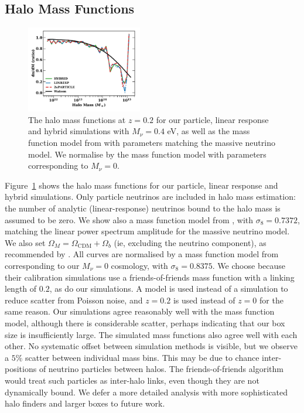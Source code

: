 \documentclass[useAMS, usenatbib]{mnras}
\begin{document}
\subsection{Halo Mass Functions}
\label{sec:halomass}

\begin{figure}
  \includegraphics[width=0.45\textwidth]{nuplots/hmf-0_8333.pdf}
\caption{The halo mass functions at $z=0.2$ for our particle, linear response and hybrid simulations with $M_\nu = 0.4$ eV, as well as the mass function model from \protect\cite{Watson_2013} with parameters matching the massive neutrino model. We normalise by the mass function model with parameters corresponding to $M_\nu = 0$.}
  \label{fig:halomass}
\end{figure}

Figure~\ref{fig:halomass} shows the halo mass functions for our particle, linear response and hybrid simulations. Only particle neutrinos are included in halo mass estimation: the number of analytic (linear-response) neutrinos bound to the halo mass is assumed to be zero. We show also a mass function model from \cite{Watson_2013}, with $\sigma_8 = 0.7372$, matching the linear power spectrum amplitude for the massive neutrino model. We also set $\Omega_M = \Omega_\mathrm{CDM} + \Omega_b$ (ie, excluding the neutrino component), as recommended by \cite{FVN_2014}. All curves are normalised by a mass function model from \cite{Watson_2013} corresponding to our $M_\nu = 0$ cosmology, with $\sigma_8 = 0.8375$. We choose \cite{Watson_2013} because their calibration simulations use a friends-of-friends mass function with a linking length of $0.2$, as do our simulations. A model is used instead of a simulation to reduce scatter from Poisson noise, and $z=0.2$ is used instead of $z=0$ for the same reason. Our simulations agree reasonably well with the mass function model, although there is considerable scatter, perhaps indicating that our box size is insufficiently large. The simulated mass functions also agree well with each other. No systematic offset between simulation methods is visible, but we observe a $5\%$ scatter between individual mass bins. This may be due to chance inter-positions of neutrino particles between halos. The friends-of-friends algorithm would treat such particles as inter-halo links, even though they are not dynamically bound. We defer a more detailed analysis with more sophisticated halo finders and larger boxes to future work.
\end{document}
